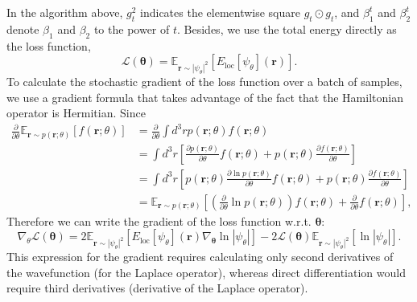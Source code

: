 \documentclass[12pt]{article}
\begin{document}
In the algorithm above, $g^2_t$ indicates the elementwise square $g_t\odot g_t$, 
and $\beta_1^t$ and $\beta_2^t$ denote $\beta_1$ and $\beta_2$ to the power of $t$. 
Besides, we use the total energy directly as the loss function,
\begin{equation}
    \mathcal{L}(\boldsymbol{\theta})=\mathbb{E}_{\mathbf{r}\sim\left|\psi_\theta
    \right|^2}\left[E_{\operatorname{loc}}\left[\psi_{\theta}\right](\mathbf{r})\right].
\end{equation}
To calculate the 
stochastic gradient of the loss function over a batch of samples, we use a gradient 
formula that takes advantage of the fact that the Hamiltonian operator is Hermitian.
Since 
\begin{equation}
    \begin{split}
        \frac{\partial}{\partial\theta}\mathbb{E}_{\mathbf{r}\sim p(\mathbf{r};\theta)}
        [f(\mathbf{r};\theta)]&=\frac{\partial}{\partial\theta}\int d^3rp(\mathbf{r};\theta)
        f(\mathbf{r};\theta)\\
        &=\int d^3r\left[\frac{\partial p(\mathbf{r};\theta)}{\partial\theta}
        f(\mathbf{r};\theta)+p(\mathbf{r};\theta)\frac{\partial f(\mathbf{r};\theta)}
        {\partial\theta}\right]\\
        &=\int d^3r\left[p(\mathbf{r};\theta)\frac{\partial \ln p(\mathbf{r};\theta)}
        {\partial\theta}f(\mathbf{r};\theta)+p(\mathbf{r};\theta)\frac{\partial 
        f(\mathbf{r};\theta)}{\partial\theta}\right]\\
        &=\mathbb{E}_{\mathbf{r}\sim p(\mathbf{r};\theta)}\left[\left(\frac{\partial}
        {\partial\theta}\ln p(\mathbf{r};\theta)\right)f(\mathbf{r};\theta)+
        \frac{\partial}{\partial \theta}f(\mathbf{r};\theta)\right],
    \end{split}
\end{equation}
Therefore we can write the gradient of the loss function w.r.t. $\mathbf{\theta}$:
\begin{equation}
    \nabla_{\theta}\mathcal{L}(\boldsymbol{\theta})=2\mathbb{E}_{\mathbf{r}
    \sim\left|\psi_\theta\right|^2}[E_{\operatorname{loc}}[\psi_{\theta}]
    (\mathbf{r})\nabla_{\boldsymbol{\theta}}\ln|\psi_{\theta}|]-2\mathcal{L}
    (\boldsymbol{\theta})\mathbb{E}_{\mathbf{r}\sim\left|\psi_\theta\right|^2}
    [\ln|\psi_{\theta}|].
\end{equation}
This expression for the gradient requires calculating only second derivatives 
of the wavefunction (for the Laplace operator), whereas direct differentiation 
would require third derivatives (derivative of the Laplace operator).
\end{document}
